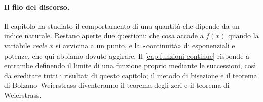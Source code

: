 \paragraph{Il filo del discorso.} Il capitolo ha studiato il comportamento di una
quantità che dipende da un indice naturale. Restano aperte due questioni: che cosa
accade a $f(x)$ quando la variabile \emph{reale} $x$ si avvicina a un punto, e la
«continuità» di esponenziali e potenze, che qui abbiamo dovuto aggirare. Il
\cref{cap:funzioni-continue} risponde a entrambe definendo il limite di una funzione
proprio mediante le successioni, così da ereditare tutti i risultati di questo capitolo;
il metodo di bisezione e il teorema di Bolzano--Weierstrass diventeranno il teorema degli
zeri e il teorema di Weierstrass.
